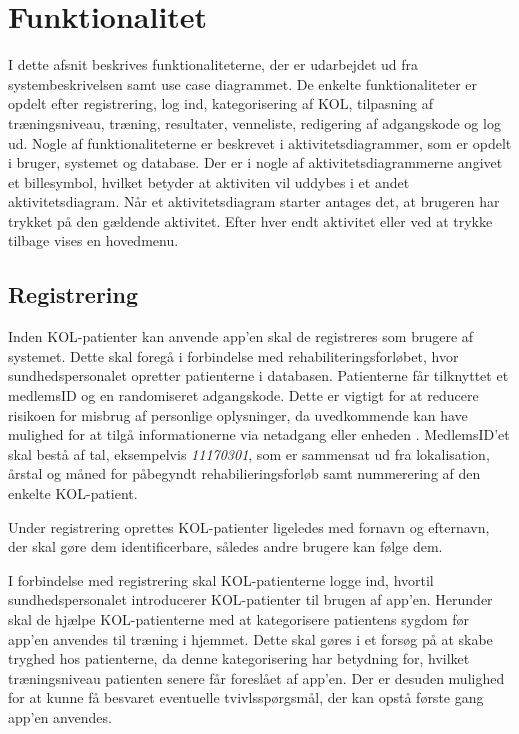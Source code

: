 \section{Funktionalitet}
I dette afsnit beskrives funktionaliteterne, der er udarbejdet ud fra systembeskrivelsen samt use case diagrammet. De enkelte funktionaliteter er opdelt efter registrering, log ind, kategorisering af KOL, tilpasning af træningsniveau, træning, resultater, venneliste, redigering af adgangskode og log ud. Nogle af funktionaliteterne er beskrevet i aktivitetsdiagrammer, som er opdelt i bruger, systemet og database. Der er i nogle af aktivitetsdiagrammerne angivet et billesymbol, hvilket betyder at aktiviten vil uddybes i et andet aktivitetsdiagram. Når et aktivitetsdiagram starter antages det, at brugeren har trykket på den gældende aktivitet. Efter hver endt aktivitet eller ved at trykke tilbage vises en hovedmenu. 

\subsection*{Registrering} \label{sec:registrering}
Inden KOL-patienter kan anvende app'en skal de registreres som brugere af systemet. Dette skal foregå i forbindelse med rehabiliteringsforløbet, hvor sundhedspersonalet opretter patienterne i databasen. Patienterne får tilknyttet et medlemsID og en randomiseret adgangskode. Dette er vigtigt for at reducere risikoen for misbrug af personlige oplysninger, da uvedkommende kan have mulighed for at tilgå informationerne via netadgang eller enheden \cite{Sundhedsdatastyrelsen2016}. MedlemsID'et skal bestå af tal, eksempelvis \textit{11170301}, som er sammensat ud fra lokalisation, årstal og måned for påbegyndt rehabilieringsforløb samt nummerering af den enkelte KOL-patient.

Under registrering oprettes KOL-patienter ligeledes med fornavn og efternavn, der skal gøre dem identificerbare, således andre brugere kan følge dem. 

I forbindelse med registrering skal KOL-patienterne logge ind, hvortil sundhedspersonalet introducerer KOL-patienter til brugen af app'en. Herunder skal de hjælpe KOL-patienterne med at kategorisere patientens sygdom før app'en anvendes til træning i hjemmet. Dette skal gøres i et forsøg på at skabe tryghed hos patienterne, da denne kategorisering har betydning for, hvilket træningsniveau patienten senere får foreslået af app'en. Der er desuden mulighed for at kunne få besvaret eventuelle tvivlsspørgsmål, der kan opstå første gang app'en anvendes. 


